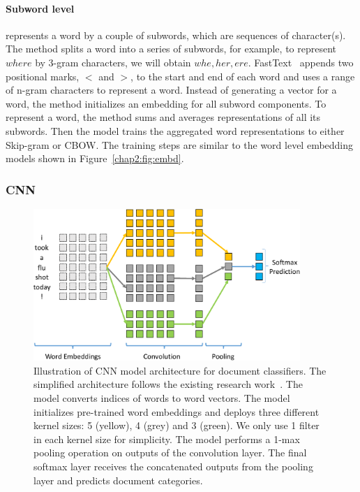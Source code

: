 
\paragraph{Subword level} represents a word by a couple of subwords, which are sequences of character(s).
The method splits a word into a series of subwords, for example, to represent $where$ by 3-gram characters, we will obtain $whe, her, ere$.
FastText~\cite{bojanowski2017enriching} appends two positional marks, $<$ and $>$, to the start and end of each word and uses a range of n-gram characters to represent a word. 
Instead of generating a vector for a word, the method initializes an embedding for all subword components.
To represent a word, the method sums and averages representations of all its subwords.
Then the model trains the aggregated word representations to either Skip-gram or CBOW.
The training steps are similar to the word level embedding models shown in Figure~\ref{chap2:fig:embd}.


\subsubsection{CNN}

\begin{figure}[t!]
\centering
\includegraphics[width=0.90\textwidth]{images/chapter2/cnn.pdf}
\caption{Illustration of CNN model architecture for document classifiers. The simplified architecture follows the existing research work~\cite{kim2014convolutional}. The model converts indices of words to word vectors. The model initializes pre-trained word embeddings and deploys three different kernel sizes: 5 (yellow), 4 (grey) and 3 (green). We only use 1 filter in each kernel size for simplicity. The model performs a 1-max pooling operation on outputs of the convolution layer. The final softmax layer receives the concatenated outputs from the pooling layer and predicts document categories.}
\label{chap2:fig:cnn}
\end{figure}

